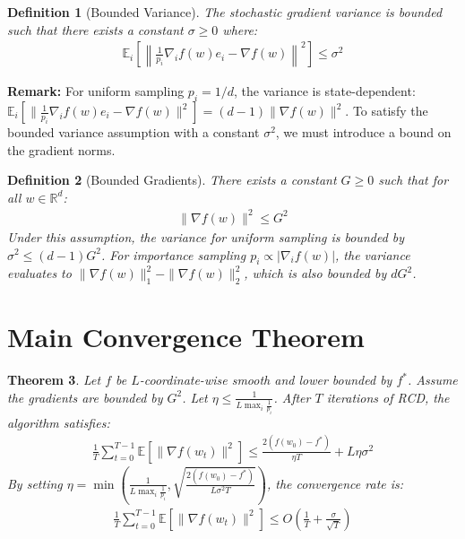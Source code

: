 \documentclass{article}
\newtheorem{theorem}{Theorem}
\newtheorem{definition}[theorem]{Definition}
\begin{document}
\begin{definition}[Bounded Variance]
The stochastic gradient variance is bounded such that there exists a constant $\sigma \geq 0$ where:
\begin{align*}
\mathbb{E}_{i} \left[ \left\| \frac{1}{p_i} \nabla_i f(w) e_i - \nabla f(w) \right\|^2 \right] \leq \sigma^2
\end{align*}
\end{definition}

\textbf{Remark:} For uniform sampling $p_i = 1/d$, the variance is state-dependent: $\mathbb{E}_i[\|\frac{1}{p_i}\nabla_i f(w)e_i - \nabla f(w)\|^2] = (d-1)\|\nabla f(w)\|^2$. To satisfy the bounded variance assumption with a constant $\sigma^2$, we must introduce a bound on the gradient norms. 

\begin{definition}[Bounded Gradients]
There exists a constant $G \geq 0$ such that for all $w \in \mathbb{R}^d$:
\begin{align*}
\|\nabla f(w)\|^2 \leq G^2
\end{align*}
Under this assumption, the variance for uniform sampling is bounded by $\sigma^2 \leq (d-1)G^2$. For importance sampling $p_i \propto |\nabla_i f(w)|$, the variance evaluates to $\|\nabla f(w)\|_1^2 - \|\nabla f(w)\|_2^2$, which is also bounded by $d G^2$.
\end{definition}

\section*{Main Convergence Theorem}
\begin{theorem}
Let $f$ be $L$-coordinate-wise smooth and lower bounded by $f^*$. Assume the gradients are bounded by $G^2$. Let $\eta \leq \frac{1}{L \max_i \frac{1}{p_i}}$. After $T$ iterations of RCD, the algorithm satisfies:
\begin{align*}
\frac{1}{T} \sum_{t=0}^{T-1} \mathbb{E}[\|\nabla f(w_t)\|^2] \leq \frac{2(f(w_0) - f^*)}{\eta T} + L \eta \sigma^2
\end{align*}
By setting $\eta = \min\left( \frac{1}{L \max_i \frac{1}{p_i}}, \sqrt{\frac{2(f(w_0)-f^*)}{L \sigma^2 T}} \right)$, the convergence rate is:
\begin{align*}
\frac{1}{T} \sum_{t=0}^{T-1} \mathbb{E}[\|\nabla f(w_t)\|^2] \leq O\left(\frac{1}{T} + \frac{\sigma}{\sqrt{T}}\right)
\end{align*}
\end{theorem}
\end{document}
